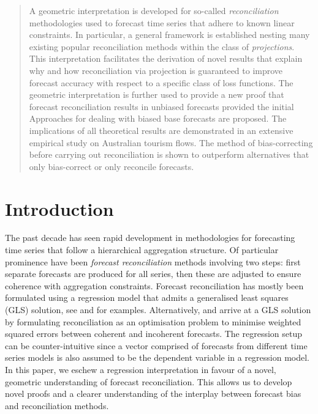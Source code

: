 \documentclass[12pt]{article}
\theoremstyle{definition}
\def\spacingset#1{\renewcommand{\baselinestretch}%
    {#1}\small\normalsize} \spacingset{1}
\begin{document}
\begin{abstract}
\spacingset{1.45}
  A geometric interpretation is developed for so-called \emph{reconciliation} methodologies used to forecast time series that adhere to known linear constraints. In particular, a general framework is established nesting many existing popular reconciliation methods within the class of \emph{projections}. This interpretation facilitates the derivation of novel results that explain why and how reconciliation via projection is guaranteed to improve forecast accuracy with respect to a specific class of loss functions. The geometric interpretation is further used to provide a new proof that forecast reconciliation results in unbiased forecasts provided the initial Approaches for dealing with biased base forecasts are proposed.  The implications of all theoretical results are demonstrated in an extensive empirical study on Australian tourism flows. The method of bias-correcting before carrying out reconciliation is shown to outperform alternatives that only bias-correct or only reconcile forecasts.

\end{abstract}


\newpage
\spacingset{1.45} %

\section{Introduction}\label{sec:intro}

The past decade has seen rapid development in methodologies for forecasting time series that follow a hierarchical aggregation structure. Of particular prominence have been \emph{forecast reconciliation} methods involving two steps: first separate forecasts are produced for all series, then these are adjusted to ensure coherence with aggregation constraints. Forecast reconciliation has mostly been formulated using a regression model {\color{blue} that admits a generalised least squares (GLS) solution}, see \citet{Hyndman2011} and \citet{WicEtAl2019} for examples. {\color{blue} Alternatively, \cite{VanErven2015a} and \cite{NysEtAl2019} arrive at a GLS solution by formulating reconciliation as an optimisation problem to minimise weighted squared errors between coherent and incoherent forecasts}.  The regression setup can be counter-intuitive since a vector comprised of forecasts from different time series models is also assumed to be the dependent variable in a regression model. In this paper, we eschew a regression interpretation in favour of a novel, geometric understanding of forecast reconciliation. This allows us to develop novel proofs and a clearer understanding of the interplay between forecast bias and reconciliation methods.
\end{document}

